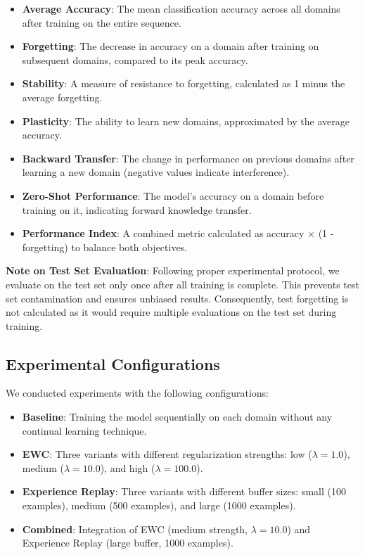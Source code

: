 \documentclass[conference]{IEEEtran}
\begin{document}
\begin{itemize}
    \item \textbf{Average Accuracy}: The mean classification accuracy across all domains after training on the entire sequence.
    \item \textbf{Forgetting}: The decrease in accuracy on a domain after training on subsequent domains, compared to its peak accuracy.
    \item \textbf{Stability}: A measure of resistance to forgetting, calculated as 1 minus the average forgetting.
    \item \textbf{Plasticity}: The ability to learn new domains, approximated by the average accuracy.
    \item \textbf{Backward Transfer}: The change in performance on previous domains after learning a new domain (negative values indicate interference).
    \item \textbf{Zero-Shot Performance}: The model's accuracy on a domain before training on it, indicating forward knowledge transfer.
    \item \textbf{Performance Index}: A combined metric calculated as accuracy × (1 - forgetting) to balance both objectives.
\end{itemize}

\textbf{Note on Test Set Evaluation}: Following proper experimental protocol, we evaluate on the test set only once after all training is complete. This prevents test set contamination and ensures unbiased results. Consequently, test forgetting is not calculated as it would require multiple evaluations on the test set during training.

\subsection{Experimental Configurations}
We conducted experiments with the following configurations:

\begin{itemize}
    \item \textbf{Baseline}: Training the model sequentially on each domain without any continual learning technique.
    \item \textbf{EWC}: Three variants with different regularization strengths: low ($\lambda=1.0$), medium ($\lambda=10.0$), and high ($\lambda=100.0$).
    \item \textbf{Experience Replay}: Three variants with different buffer sizes: small (100 examples), medium (500 examples), and large (1000 examples).
    \item \textbf{Combined}: Integration of EWC (medium strength, $\lambda=10.0$) and Experience Replay (large buffer, 1000 examples).
\end{itemize}
\end{document}
